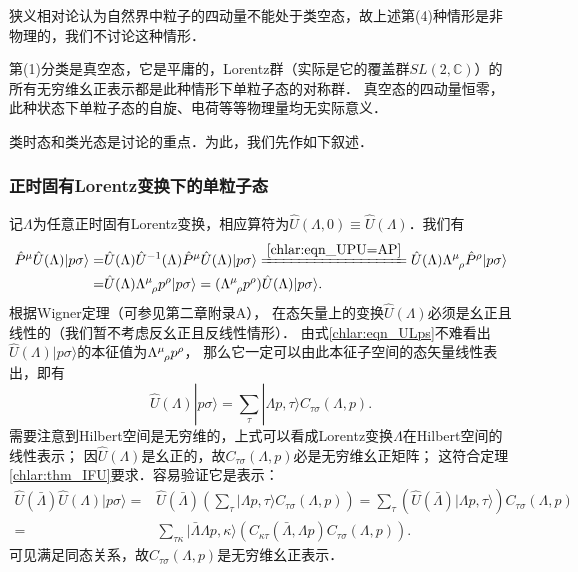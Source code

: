 狭义相对论认为自然界中粒子的四动量不能处于类空态，故上述第(4)种情形是非物理的，我们不讨论这种情形．

第(1)分类是{\kaishu 真空态}，它是平庸的，Lorentz群（实际是它的覆盖群$SL(2,\mathbb{C})$）的
所有无穷维幺正表示都是此种情形下单粒子态的对称群．
真空态的四动量恒零，此种状态下单粒子态的自旋、电荷等等物理量均无实际意义．

{\kaishu 类时态}和{\kaishu 类光态}是讨论的重点．为此，我们先作如下叙述．

\subsubsection{正时固有Lorentz变换下的单粒子态}

记$\Lambda$为任意正时固有Lorentz变换，相应算符为$\hat{U}(\Lambda,0)\equiv \hat{U}(\Lambda)$．我们有
\begin{align}
	\hat{P}^\mu \hat{U}(\Lambda) |p\sigma\rangle =&
	\hat{U}(\Lambda)\hat{U}^{-1}(\Lambda)\hat{P}^\mu \hat{U}(\Lambda) |p\sigma\rangle 
	\xlongequal{\ref{chlar:eqn_UPU=AP}}
	\hat{U}(\Lambda) \Lambda_{\hphantom{\nu}\rho}^{\mu}  \hat{P}^{\rho} |p\sigma\rangle \notag \\
	=& \hat{U}(\Lambda) \Lambda_{\hphantom{\nu}\rho}^{\mu}  p^{\rho} |p\sigma\rangle 
	= (\Lambda_{\hphantom{\nu}\rho}^{\mu}  p^{\rho}) \hat{U}(\Lambda) |p\sigma\rangle .	\label{chlar:eqn_ULps}
\end{align}
根据Wigner定理（可参见\parencite{weinberg_vol1}第二章附录A），
在态矢量上的变换$\hat{U}(\Lambda)$必须是幺正且线性的（我们暂不考虑反幺正且反线性情形）．
由式\eqref{chlar:eqn_ULps}不难看出$\hat{U}(\Lambda) |p\sigma\rangle$的本征值为$\Lambda_{\hphantom{\nu}\rho}^{\mu}  p^{\rho}$，
那么它一定可以由此本征子空间的态矢量线性表出，即有
\begin{equation}\label{chlar:eqn_UpC}
	\hat{U}(\Lambda) |p\sigma\rangle = \sum_{\tau} |\Lambda p,\tau \rangle C_{\tau\sigma}(\Lambda,p).
\end{equation}
需要注意到Hilbert空间是无穷维的，上式可以看成Lorentz变换$\Lambda$在Hilbert空间的线性表示；
因$\hat{U}(\Lambda)$是幺正的，故$C_{\tau\sigma}(\Lambda,p)$必是无穷维幺正矩阵；
这符合定理\ref{chlar:thm_IFU}要求．容易验证它是表示：
\begin{align*}
	\hat{U}(\bar{\Lambda}) \hat{U}(\Lambda) |p\sigma\rangle = &
	\hat{U}(\bar{\Lambda})\left(\sum_{\tau} |\Lambda p,\tau \rangle C_{\tau\sigma}(\Lambda,p) \right)
	=\sum_{\tau} \left( \hat{U}(\bar{\Lambda})|\Lambda p,\tau \rangle \right) C_{\tau\sigma}(\Lambda,p) \\
	=&\sum_{\tau\kappa}  |\bar{\Lambda}\Lambda p,\kappa \rangle 
	\left(C_{\kappa\tau}(\bar{\Lambda},\Lambda p)  C_{\tau\sigma}(\Lambda,p) \right).
\end{align*}
可见满足同态关系，故$C_{\tau\sigma}(\Lambda,p)$是无穷维幺正表示．


